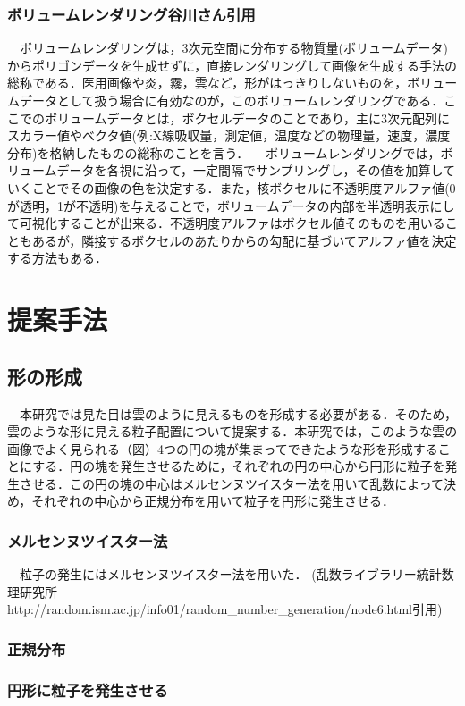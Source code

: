 \documentclass[11pt]{jreport}
\begin{document}
\subsection{ボリュームレンダリング谷川さん引用}
　ボリュームレンダリングは，3次元空間に分布する物質量(ボリュームデータ)からポリゴンデータを生成せずに，直接レンダリングして画像を生成する手法の総称である．医用画像や炎，霧，雲など，形がはっきりしないものを，ボリュームデータとして扱う場合に有効なのが，このボリュームレンダリングである．ここでのボリュームデータとは，ボクセルデータのことであり，主に3次元配列にスカラー値やベクタ値(例:X線吸収量，測定値，温度などの物理量，速度，濃度分布)を格納したものの総称のことを言う．
　ボリュームレンダリングでは，ボリュームデータを各視に沿って，一定間隔でサンプリングし，その値を加算していくことでその画像の色を決定する．また，核ボクセルに不透明度アルファ値(0が透明，1が不透明)を与えることで，ボリュームデータの内部を半透明表示にして可視化することが出来る．不透明度アルファはボクセル値そのものを用いることもあるが，隣接するボクセルのあたりからの勾配に基づいてアルファ値を決定する方法もある．

\chapter{提案手法}
\section{形の形成}
　本研究では見た目は雲のように見えるものを形成する必要がある．そのため，雲のような形に見える粒子配置について提案する．本研究では，このような雲の画像でよく見られる（図）4つの円の塊が集まってできたような形を形成することにする．円の塊を発生させるために，それぞれの円の中心から円形に粒子を発生させる．この円の塊の中心はメルセンヌツイスター法を用いて乱数によって決め，それぞれの中心から正規分布を用いて粒子を円形に発生させる．
\subsection{メルセンヌツイスター法}
　粒子の発生にはメルセンヌツイスター法を用いた．
(乱数ライブラリー統計数理研究所http://random.ism.ac.jp/info01/random_number_generation/node6.html引用)
\subsection{正規分布}

\subsection{円形に粒子を発生させる}
\end{document}
